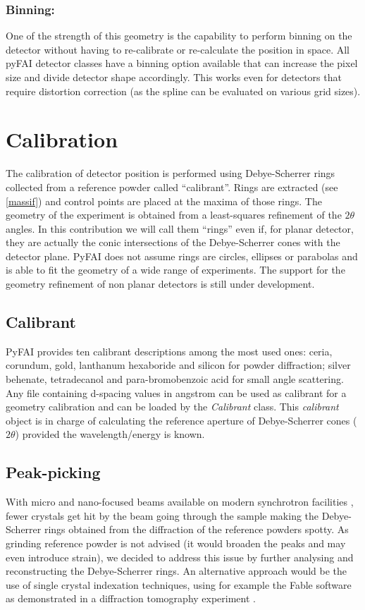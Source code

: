\documentclass[preprint]{iucr}
\begin{document}
\subsubsection{Binning:}
One of the strength of this geometry is the capability to perform binning on the
detector without having to re-calibrate or re-calculate the position in space.
All pyFAI detector classes have a binning option available that can increase the
pixel size and divide detector shape accordingly.
This works even for detectors that require distortion correction (as the spline can be
evaluated on various grid sizes).

\section{Calibration}

The calibration of detector position is performed using Debye-Scherrer
rings collected from a reference powder called ``calibrant''.
Rings are extracted (see \ref{massif}) and control points are placed at the maxima
of those rings.
The geometry of the experiment is obtained from a least-squares refinement of
the $2\theta$ angles.
In this contribution we will call them ``rings'' even if, for planar detector,
they are actually the conic intersections of the Debye-Scherrer cones
with the detector plane.
PyFAI does not assume rings are circles, ellipses or parabolas and is able to
fit the geometry of a wide range of experiments.
The support for the geometry refinement of non planar detectors is still under
development.

\subsection{Calibrant}
PyFAI provides ten calibrant descriptions among the most used ones: ceria,
corundum, gold, lanthanum hexaboride and silicon for powder diffraction;
silver behenate, tetradecanol and para-bromobenzoic acid for small angle scattering.
Any file containing d-spacing values in angstrom can be used as calibrant for a
geometry calibration and can be loaded by the \textit{Calibrant} class.
This \textit{calibrant} object is in charge of
calculating the reference aperture of Debye-Scherrer cones ($2\theta$) provided the
wavelength/energy is known.

\subsection{Peak-picking}
With micro and nano-focused beams available on modern synchrotron facilities
\cite{id13}, fewer crystals get hit by the beam going through the
sample making the Debye-Scherrer rings obtained from the diffraction of the reference
powders spotty.
As grinding reference powder is not advised (it would broaden the peaks
and may even introduce strain), we decided to
address this issue by further analysing and reconstructing the Debye-Scherrer rings.
An alternative approach would be the use of single crystal indexation techniques, using
for example the Fable software \cite{fable} as demonstrated in a diffraction
tomography experiment \cite{bonnin}.
\end{document}
